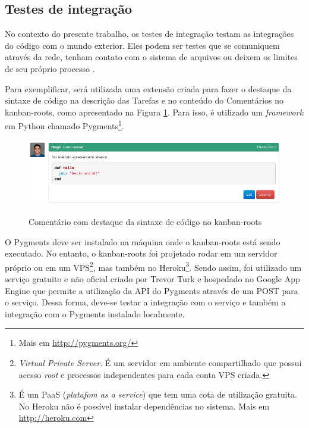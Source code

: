 
\subsection{Testes de integração}
\label{sub:testes_de_integracao}

No contexto do presente trabalho, os testes de integração testam as integrações do código com o mundo exterior. Eles podem ser testes que se comuniquem através da rede, tenham contato com o sistema de arquivos ou deixem os limites de seu próprio processo \cite{ArtOfAgileDevelopment}.

Para exemplificar, será utilizada uma extensão criada para fazer o destaque da sintaxe de código na descrição das Tarefas e no conteúdo do Comentários no kanban-roots, como apresentado na Figura \ref{img:highlighting}. Para isso, é utilizado um \textit{framework} em Python chamado Pygments\footnote{ Mais em \url{http://pygments.org/}}.

\begin{figure}[h]
  \center
  \caption{Comentário com destaque da sintaxe de código no kanban-roots}
  \includegraphics[scale=0.5]{images/highlighting}
  \label{img:highlighting}
\end{figure}

O Pygments deve ser instalado na máquina onde o kanban-roots está sendo executado. No entanto, o kanban-roots foi projetado rodar em um servidor próprio ou em um VPS\footnote{ \textit{Virtual Private Server}. É um servidor em ambiente compartilhado que possui acesso \textit{root} e processos independentes para cada conta VPS criada.}, mas também no Heroku\footnote{ É um PaaS (\textit{platafom as a service}) que tem uma cota de utilização gratuita. No Heroku não é possível instalar dependências no sistema. Mais em \url{http://heroku.com}}. Sendo assim, foi utilizado um serviço gratuito e não oficial criado por Trevor Turk e hospedado no Google App Engine que permite a utilização da API  do Pygments através de um POST para o serviço. Dessa forma, deve-se testar a integração com o serviço e também a integração com o Pygments instalado localmente.

